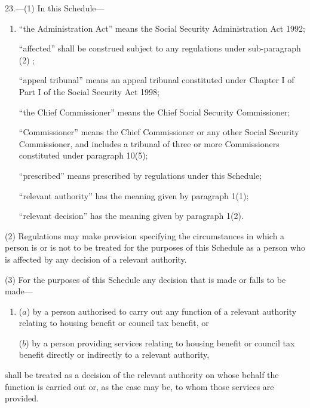 \documentclass[12pt,a4paper]{article}
\begin{document}
23.---(1) In this Schedule—
\begin{enumerate}\item[]
    “the Administration Act” means the Social Security Administration Act 1992;

    “affected” shall be construed subject to any regulations under sub-\hspace{0pt}paragraph (2) ;

    “appeal tribunal” means an appeal tribunal constituted under Chapter I of Part I of the Social Security Act 1998;

    “the Chief Commissioner” means the Chief Social Security Commissioner;

    “Commissioner” means the Chief Commissioner or any other Social Security Commissioner, and includes a tribunal of three or more Commissioners constituted under paragraph 10(5);

    “prescribed” means prescribed by regulations under this Schedule;

    “relevant authority” has the meaning given by paragraph 1(1);

    “relevant decision” has the meaning given by paragraph 1(2). 
\end{enumerate}

(2) Regulations may make provision specifying the circumstances in which a person is or is not to be treated for the purposes of this Schedule as a person who is affected by any decision of a relevant authority.

(3) For the purposes of this Schedule any decision that is made or falls to be made—
\begin{enumerate}\item[]
($a$) by a person authorised to carry out any function of a relevant authority relating to housing benefit or council tax benefit, or

($b$) by a person providing services relating to housing benefit or council tax benefit directly or indirectly to a relevant authority,
\end{enumerate}
shall be treated as a decision of the relevant authority on whose behalf the function is carried out or, as the case may be, to whom those services are provided. 

\end{document}
